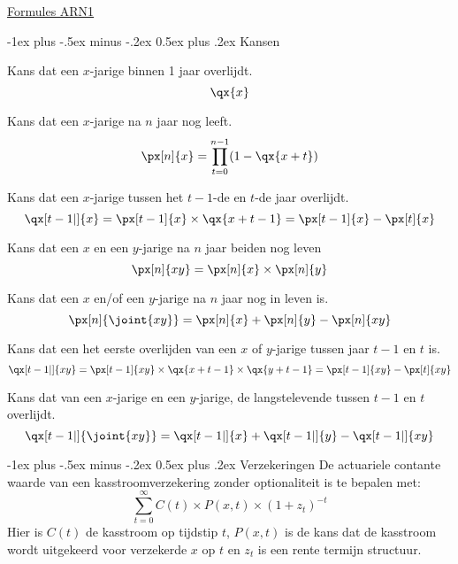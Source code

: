 \documentclass[10pt,landscape]{article}
\makeatletter
\renewcommand{\section}{\@startsection{section}{1}{0mm}%
                                {-1ex plus -.5ex minus -.2ex}%
                                {0.5ex plus .2ex}%
                                {\normalfont\large\bfseries}}
\makeatother
\begin{document}
\raggedright
\footnotesize
\begin{multicols}{3}


\setlength{\premulticols}{1pt}
\setlength{\postmulticols}{1pt}
\setlength{\multicolsep}{1pt}
\setlength{\columnsep}{2pt}

\begin{center}
     \Large{\underline{Formules ARN1}} \\
\end{center}

\section{Kansen}

Kans dat een $x$-jarige binnen 1 jaar overlijdt. 
$$\qx{x}$$

Kans dat een $x$-jarige na $n$ jaar nog leeft.
$$ \px[n]{x} = \prod_{t=0}^{n-1} (1-\qx{x+t}) $$ 

Kans dat een $x$-jarige tussen het $t-1$-de en $t$-de jaar overlijdt.
$$ \qx[t-1|]{x} = \px[t-1]{x} \times \qx{x+t-1} = \px[t-1]{x} - \px[t]{x} $$ 

Kans dat een $x$ en een $y$-jarige na $n$ jaar beiden nog leven
$$ \px[n]{xy} = \px[n]{x} \times \px[n]{y} $$

Kans dat een $x$ en/of een $y$-jarige na $n$ jaar nog in leven is.
$$ \px[n]{\joint{xy}} = \px[n]{x} + \px[n]{y} - \px[n]{xy} $$

Kans dat een het eerste overlijden van een $x$ of $y$-jarige tussen jaar $t-1$ en $t$ is.
$$ \qx[t-1|]{xy} = \px[t-1]{xy} \times \qx{x+t-1} \times \qx{y+t-1} = \px[t-1]{xy} - \px[t]{xy} $$

Kans dat van een $x$-jarige en een $y$-jarige, de langstelevende tussen $t-1$ en $t$ overlijdt.
$$ \qx[t-1|]{\joint{xy}} = \qx[t-1|]{x} + \qx[t-1|]{y} - \qx[t-1|]{xy} $$

\section{Verzekeringen}
De actuariele contante waarde van een kasstroomverzekering zonder optionaliteit is te bepalen met:
$$ \sum_{t=0}^{\infty} C(t) \times P(x, t) \times (1 + z_{t})^{-t} $$
Hier is $C(t)$ de kasstroom op tijdstip $t$, $P(x, t)$ is de kans dat de kasstroom wordt uitgekeerd voor verzekerde $x$ op $t$ en $z_{t}$ is een rente termijn structuur.


\end{multicols}
\end{document}
